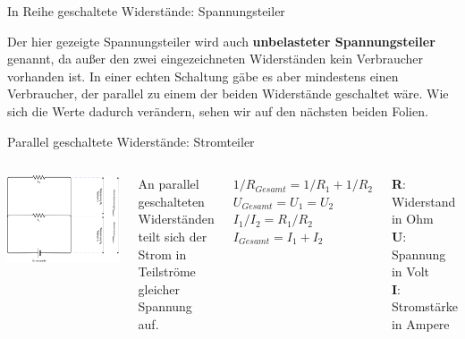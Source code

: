 {\begin{frame}{In Reihe geschaltete Widerstände: Spannungsteiler}
    \bigskip

    \parbox{\linewidth}{
        \footnotesize
        Der hier gezeigte Spannungsteiler wird auch \textbf{unbelasteter Spannungsteiler}
        genannt, da außer den zwei eingezeichneten Widerständen kein Verbraucher vorhanden
        ist. In einer echten Schaltung gäbe es aber mindestens einen Verbraucher, der parallel
        zu einem der beiden Widerstände geschaltet wäre. Wie sich die Werte dadurch verändern,
        sehen wir auf den nächsten beiden Folien.
    }
\end{frame}
}

{
\small

\begin{frame}{Parallel geschaltete Widerstände: Stromteiler}
    \begin{columns}
        \includegraphics[width=.9\textwidth]{2-hardwaredesign/img/stromteiler}

        An parallel geschalteten Widerständen teilt sich der Strom in
        Teilströme gleicher Spannung auf.

        \bigskip

        $1/R_{Gesamt} = 1/R_1 + 1/R_2$ \\
        \smallskip
        $U_{Gesamt} = U_1 = U_2$ \\
        \smallskip
        $I_1 / I_2 = R_1 / R_2$ \\
        \smallskip
        $I_{Gesamt} = I_1 + I_2$ \\

        \bigskip

        \textbf{R}: Widerstand in Ohm \\
        \smallskip
        \textbf{U}: Spannung in Volt \\
        \smallskip
        \textbf{I}: Stromstärke in Ampere \\
    \end{columns}


\end{frame}}
